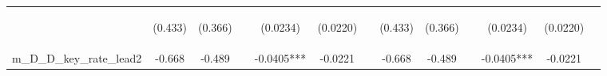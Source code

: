 \documentclass[]{article}
\begin{document}
\begin{center}
\begin{tabular}{lcccccccccccc}
\vspace{4pt} & \begin{footnotesize}(0.433)\end{footnotesize} & \begin{footnotesize}(0.366)\end{footnotesize} & \begin{footnotesize}\end{footnotesize} & \begin{footnotesize}(0.0234)\end{footnotesize} & \begin{footnotesize}(0.0220)\end{footnotesize} & \begin{footnotesize}\end{footnotesize} & \begin{footnotesize}(0.433)\end{footnotesize} & \begin{footnotesize}(0.366)\end{footnotesize} & \begin{footnotesize}\end{footnotesize} & \begin{footnotesize}(0.0234)\end{footnotesize} & \begin{footnotesize}(0.0220)\end{footnotesize} & \begin{footnotesize}\end{footnotesize} \\
m\_D\_D\_key\_rate\_lead2 & -0.668 & -0.489 &  & -0.0405*** & -0.0221 &  & -0.668 & -0.489 &  & -0.0405*** & -0.0221 &  \\

\end{tabular}
\end{center}
\end{document}
